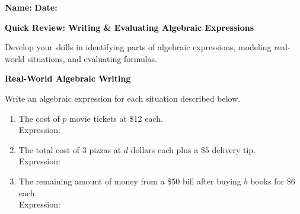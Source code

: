 \documentclass[12pt, letterpaper, fleqn]{article}
\newcommand{\blanklong}{\underline{\hspace{6.5cm}}}
\begin{document}
\textbf{Name:} \underline{\hspace{5cm}}
\hfill
\textbf{Date:} \underline{\hspace{3cm}}\\

\begin{tcolorbox}[colback=black!10]
    \large\textcolor{black}{\textbf{Quick Review: Writing \& Evaluating Algebraic Expressions}}
\end{tcolorbox}

\vspace{3mm}
\noindent
Develop your skills in identifying parts of algebraic expressions, modeling real-world situations, and evaluating formulas.

\vspace{4mm}

\begin{tcolorbox}[colback=black!10]
\large\textcolor{black}{\textbf{Real-World Algebraic Writing}}
\end{tcolorbox}

\noindent
Write an algebraic expression for each situation described below.

\vspace{3mm}

\begin{enumerate}[itemsep=2.2cm, leftmargin=0.6cm]

\item The cost of $p$ movie tickets at \$12 each. \\
Expression: \blanklong

\vspace{2cm}

\item The total cost of 3 pizzas at $d$ dollars each plus a \$5 delivery tip. \\
Expression: \blanklong

\vspace{2cm}

\item The remaining amount of money from a \$50 bill after buying $b$ books for \$6 each. \\
Expression: \blanklong

\vspace{2cm}

\end{enumerate}
\end{document}
